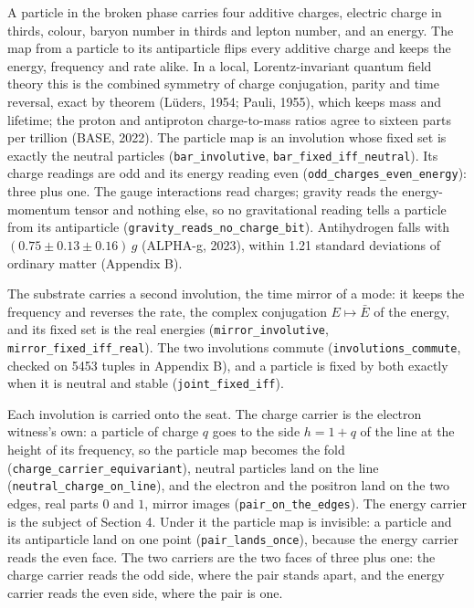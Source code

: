 \documentclass[10pt]{article}
\begin{document}
A particle in the broken phase carries four additive charges, electric
charge in thirds, colour, baryon number in thirds and lepton number, and
an energy. The map from a particle to its antiparticle flips every
additive charge and keeps the energy, frequency and rate alike. In a
local, Lorentz-invariant quantum field theory this is the combined
symmetry of charge conjugation, parity and time reversal, exact by
theorem (Lüders, 1954; Pauli, 1955), which keeps mass and lifetime; the
proton and antiproton charge-to-mass ratios agree to sixteen parts per
trillion (BASE, 2022). The particle map is an involution whose fixed set
is exactly the neutral particles (\texttt{bar\_involutive},
\texttt{bar\_fixed\_iff\_neutral}). Its charge readings are odd and its
energy reading even (\texttt{odd\_charges\_even\_energy}): three plus
one. The gauge interactions read charges; gravity reads the
energy-momentum tensor and nothing else, so no gravitational reading
tells a particle from its antiparticle
(\texttt{gravity\_reads\_no\_charge\_bit}). Antihydrogen falls with
\((0.75\pm0.13\pm0.16)\,g\) (ALPHA-g, 2023), within 1.21 standard
deviations of ordinary matter (Appendix B).

The substrate carries a second involution, the time mirror of a mode: it
keeps the frequency and reverses the rate, the complex conjugation
\(E\mapsto\bar E\) of the energy, and its fixed set is the real energies
(\texttt{mirror\_involutive}, \texttt{mirror\_fixed\_iff\_real}). The
two involutions commute (\texttt{involutions\_commute}, checked on 5453
tuples in Appendix B), and a particle is fixed by both exactly when it
is neutral and stable (\texttt{joint\_fixed\_iff}).

Each involution is carried onto the seat. The charge carrier is the
electron witness's own: a particle of charge \(q\) goes to the side
\(h=1+q\) of the line at the height of its frequency, so the particle
map becomes the fold (\texttt{charge\_carrier\_equivariant}), neutral
particles land on the line (\texttt{neutral\_charge\_on\_line}), and the
electron and the positron land on the two edges, real parts \(0\) and
\(1\), mirror images (\texttt{pair\_on\_the\_edges}). The energy carrier
is the subject of Section 4. Under it the particle map is invisible: a
particle and its antiparticle land on one point
(\texttt{pair\_lands\_once}), because the energy carrier reads the even
face. The two carriers are the two faces of three plus one: the charge
carrier reads the odd side, where the pair stands apart, and the energy
carrier reads the even side, where the pair is one.
\end{document}
